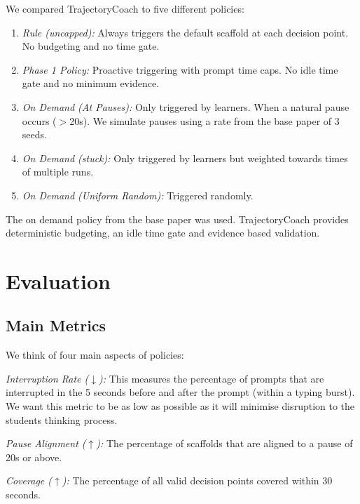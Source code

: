 \documentclass[conference]{IEEEtran}
\begin{document}
We compared TrajectoryCoach to five different policies:

\begin{enumerate}
\item[1)] \textit{Rule (uncapped):} Always triggers the default scaffold at each decision point. No budgeting and no time gate.

\item[2)] \textit{Phase 1 Policy:} Proactive triggering with prompt time caps. No idle time gate and no minimum evidence.

\item[3)] \textit{On Demand (At Pauses):} Only triggered by learners. When a natural pause occurs ($>$20s). We simulate pauses using a rate from the base paper of 3 seeds.

\item[4)] \textit{On Demand (stuck):} Only triggered by learners but weighted towards times of multiple runs.

\item[5)] \textit{On Demand (Uniform Random):} Triggered randomly.
\end{enumerate}

The on demand policy from the base paper was used. TrajectoryCoach provides deterministic budgeting, an idle time gate and evidence based validation.

\section{Evaluation}

\subsection{Main Metrics}

We think of four main aspects of policies:

\textit{Interruption Rate ($\downarrow$):} This measures the percentage of prompts that are interrupted in the 5 seconds before and after the prompt (within a typing burst). We want this metric to be as low as possible as it will minimise disruption to the students thinking process.

\textit{Pause Alignment ($\uparrow$):} The percentage of scaffolds that are aligned to a pause of 20s or above.

\textit{Coverage ($\uparrow$):} The percentage of all valid decision points covered within 30 seconds.
\end{document}
